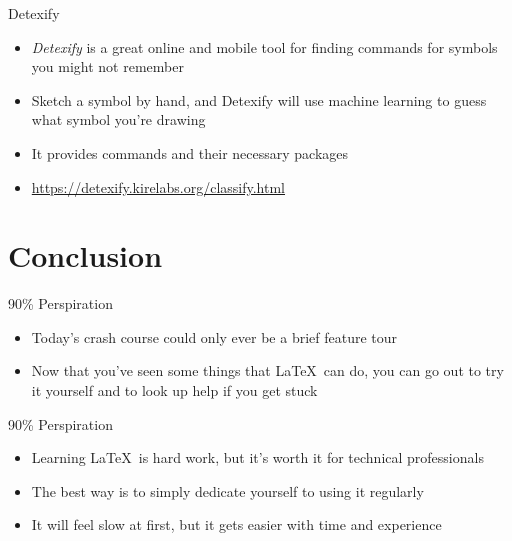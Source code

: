 \documentclass{beamer} %
\begin{document}
\begin{frame}{Detexify}

\begin{itemize}
	\item \textit{Detexify} is a great online and mobile tool for finding commands for symbols you might not remember
	\item Sketch a symbol by hand, and Detexify will use machine learning to guess what symbol you're drawing
	\item It provides commands and their necessary packages
	\item \url{https://detexify.kirelabs.org/classify.html}
\end{itemize}

\end{frame}

\section{Conclusion}

\begin{frame}{90\% Perspiration}

\begin{itemize}
	\item Today's crash course could only ever be a brief feature tour
	\item Now that you've seen some things that \LaTeX\ can do, you can go out to try it yourself and to look up help if you get stuck
\end{itemize}

\end{frame}

\begin{frame}{90\% Perspiration}

\begin{itemize}
	\item Learning \LaTeX\ is hard work, but it's worth it for technical professionals
	\item The best way is to simply dedicate yourself to using it regularly
	\item It will feel slow at first, but it gets easier with time and experience
\end{itemize}

\end{frame}
\end{document}
